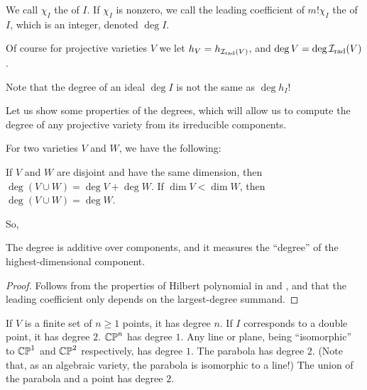 \begin{definition}
	We call $\chi_I$ the  of $I$.
	If $\chi_I$ is nonzero, we call the leading coefficient of
	$m! \chi_I$ the  of $I$, which is an integer,
	denoted $\deg I$.

	Of course for projective varieties $V$ we let $h_V = h_{\mathcal I_{\text{rad}}(V)}$, and $\deg
	V = \deg \mathcal I_{\text{rad}}(V)$.
\end{definition}

\begin{remark}
	Note that the degree of an ideal $\deg I$ is not the same as $\deg h_I$!
\end{remark}

Let us show some properties of the degrees, which will allow us to compute the
degree of any projective variety from its irreducible components.
\begin{proposition}
	For two varieties $V$ and $W$, we have the following:
	\begin{itemize}
		\ii If $V$ and $W$ are disjoint and have the same dimension, then $\deg (V \cup W)=\deg
			V+\deg W$.
		\ii If $\dim V<\dim W$, then $\deg (V \cup W)=\deg W$.
	\end{itemize}
\end{proposition}
So,
\begin{moral}
	The degree is additive over components,
	and it measures the ``degree'' of the highest-dimensional component.
\end{moral}


\begin{proof}
	Follows from the properties of Hilbert polynomial in
		 and
	,
	and that the leading coefficient
	only depends on the largest-degree summand.
\end{proof}

\begin{example}
	\listhack
	\begin{enumerate}[(a)]
		\ii If $V$ is a finite set of $n \ge 1$ points, it has degree $n$.
		\ii If $I$ corresponds to a double point, it has degree $2$.
		\ii $\mathbb{CP}^n$ has degree $1$.
		\ii Any line or plane, being ``isomorphic'' to $\mathbb{CP}^1$ and $\mathbb{CP}^2$
		respectively, has degree $1$.
		\ii The parabola has degree $2$. (Note that, as an algebraic variety, the parabola is isomorphic
		to a line!)
		\ii The union of the parabola and a point has degree $2$.
	\end{enumerate}
\end{example}

